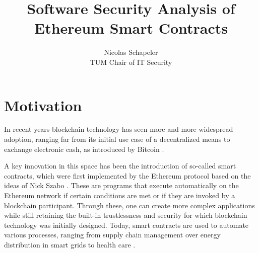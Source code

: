 \documentclass[letterpaper,twocolumn,10pt]{article}
\begin{document}

\date{}

\title{\Large \bf Software Security Analysis of Ethereum Smart Contracts}

\author{
{\rm Nicolas Schapeler}\\
TUM Chair of IT Security
} %

\maketitle

\begin{abstract}
\end{abstract}


\section{Motivation}
In recent years blockchain technology has seen more and more widespread adoption, ranging far from its initial use case of a decentralized means to exchange electronic cash, as introduced by Bitcoin \cite{nakamoto}. 

A key innovation in this space has been the introduction of so-called smart contracts, which were first implemented by the Ethereum protocol based on the ideas of Nick Szabo \cite{szabo_1996}. These are programs that execute automatically on the Ethereum network if certain conditions are met or if they are invoked by a blockchain participant. Through these, one can create more complex applications while still retaining the built-in trustlessness and security for which blockchain technology was initially designed. Today, smart contracts are used to automate various processes, ranging from supply chain management \cite{bhandari_2018} over energy distribution in smart grids \cite{giannakaris_trakadas_zahariadis_gkonis_papadopoulos_2019} to health care \cite{griggs_ossipova_kohlios_baccarini_howson_hayajneh_2018}. 
\end{document}
